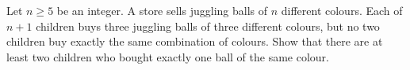 Let $n \geq 5$ be an integer.
A store sells juggling balls of $n$ different colours.
Each of $n+1$ children buys three juggling balls of three different colours,
but no two children buy exactly the same combination of colours.
Show that there are at least two children who bought exactly one ball of the same colour.
